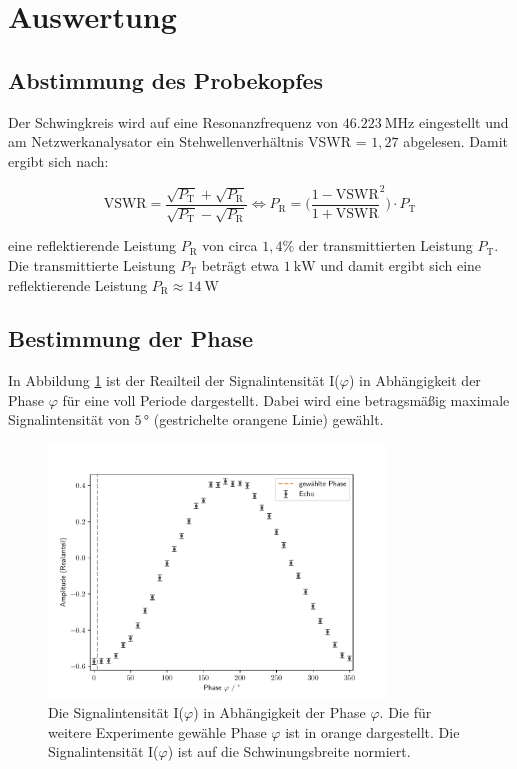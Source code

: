 \section{Auswertung}
\label{sec:Auswertung}

\subsection{Abstimmung des Probekopfes}
\label{sec:Abstimmung}
Der Schwingkreis wird auf eine Resonanzfrequenz von $\SI{46,223}{\mega\hertz}$
eingestellt und am Netzwerkanalysator ein Stehwellenverhältnis VSWR =
$\si{1,27}$ abgelesen. Damit ergibt sich nach:

\begin{equation}
    \text{VSWR} = \frac{\sqrt{P_{\text{T}}} + \sqrt{P_{\text{R}}}}
                {\sqrt{P_{\text{T}}} - \sqrt{P_{\text{R}}}}
    \iff
    P_{\text{R}} = \biggl( \frac{1-\text{VSWR}}{1+\text{VSWR}}^2 \biggr) \cdot P_{\text{T}}
\end{equation}

\noindent
eine reflektierende Leistung $P_{\text{R}}$ von circa $1,4\%$ der transmittierten
Leistung $P_{\text{T}}$. Die transmittierte Leistung $P_{\text{T}}$ beträgt etwa
$\SI{1}{\kilo\watt}$ und damit ergibt sich eine reflektierende Leistung
$P_{\text{R}} \approx \SI{14}{\watt}$

\subsection{Bestimmung der Phase}
\label{sec:phase}
In Abbildung \ref{fig:phase} ist der Reailteil der Signalintensität I($\varphi$) in Abhängigkeit
der Phase $\varphi$ für eine voll Periode dargestellt. Dabei wird eine betragsmäßig
maximale Signalintensität von $5\,°$ (gestrichelte orangene Linie) gewählt.

\begin{figure}[H]
    \centering
    \includegraphics[width=0.8\textwidth]{Auswertung/winkel.pdf}
    \caption{Die Signalintensität I($\varphi$) in Abhängigkeit der Phase $\varphi$.
    Die für weitere Experimente gewähle Phase $\varphi$ ist in orange dargestellt.
    Die Signalintensität I($\varphi$) ist auf die Schwinungsbreite normiert.}
    \label{fig:phase}
\end{figure}

